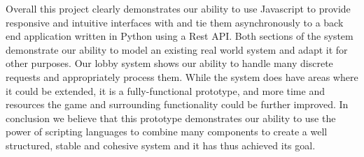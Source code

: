 Overall this project clearly demonstrates our ability to use Javascript to provide responsive and intuitive interfaces with and tie them asynchronously to a back end application written in Python using a Rest API. Both sections of the system demonstrate our ability to model an existing real world system and adapt it for other purposes. Our lobby system shows our ability to handle many discrete requests and appropriately process them. While the system does have areas where it could be extended, it is a fully-functional prototype, and more time and resources the game and surrounding functionality could be further improved. In conclusion we believe that this prototype demonstrates our ability to use the power of scripting languages to combine many components to create a well structured, stable and cohesive system and it has thus achieved its goal.
